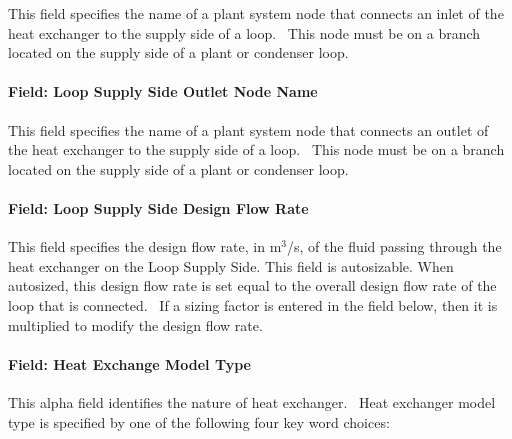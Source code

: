 This field specifies the name of a plant system node that connects an inlet of the heat exchanger to the supply side of a loop.~ This node must be on a branch located on the supply side of a plant or condenser loop.

\paragraph{Field: Loop Supply Side Outlet Node Name}\label{field-loop-supply-side-outlet-node-name}

This field specifies the name of a plant system node that connects an outlet of the heat exchanger to the supply side of a loop.~ This node must be on a branch located on the supply side of a plant or condenser loop.

\paragraph{Field: Loop Supply Side Design Flow Rate}\label{field-loop-supply-side-design-flow-rate}

This field specifies the design flow rate, in m\(^{3}\)/s, of the fluid passing through the heat exchanger on the Loop Supply Side. This field is autosizable. When autosized, this design flow rate is set equal to the overall design flow rate of the loop that is connected.~ If a sizing factor is entered in the field below, then it is multiplied to modify the design flow rate.

\paragraph{Field: Heat Exchange Model Type}\label{field-heat-exchange-model-type}

This alpha field identifies the nature of heat exchanger.~ Heat exchanger model type is specified by one of the following four key word choices:

